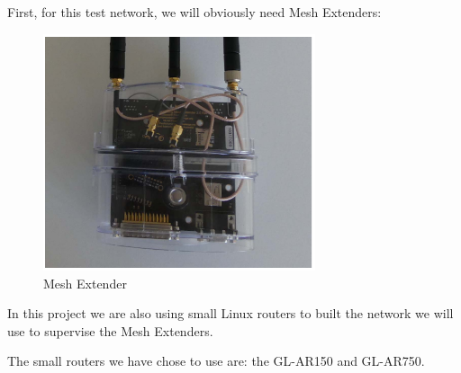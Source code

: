 First, for this test network, we will obviously need Mesh Extenders:
\begin{figure}[H]
\begin{center}
\includegraphics[width=8cm]{image/meshextender.png}%
\caption{Mesh Extender}%
\label{figure:ME}%
\end{center}
\end{figure}


In this project we are also using small Linux routers to built the network we will use to supervise the Mesh Extenders.

The small routers we have chose to use are: the GL-AR150 and GL-AR750.

